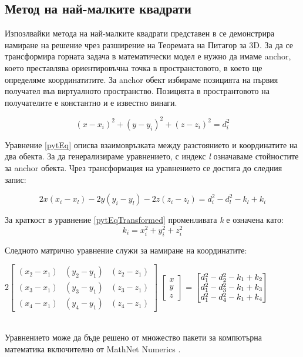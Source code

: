 \subsection{Метод на най-малките квадрати} \label{squares_algorithm}

Изпозлвайки метода на най-малките квадрати представен в \cite{leastsq} се демонстрира намиране на решение чрез разширение на Теоремата на Питагор за 3D. За да се трансформира горната задача в математически модел е нужно да имаме anchor\cite{leastsq2}, което преставлява ориентировъчна точка в пространстовото, в което ще определяме координатитите. За anchor обект избираме позицията на първия получател във виртуалното пространство. Позицията в пространтовото на получателите е константно и е известно винаги.


\begin{equation} \label{pytEq}
   (x-x_i)^2 + (y-y_i)^2 + (z-z_i)^2=d_i^2
\end{equation}

Уравнение \ref{pytEq} описва взаимовръзката между разстоянието и координатите на два обекта. За да генерализираме уравнението, с индекс \textit{l} означаваме стойностите за anchor обекта. Чрез трансформация на уравнението се достига до следния запис:

\begin{equation} \label{pytEqTransformed}
  2 x (x_i - x_l) - 2 y (y_i - y_l) - 2  z  (z_i - z_l) = d^2_i - d^2_l - k_l + k_i
\end{equation}

За краткост в уравнение \ref{pytEqTransformed} променливата \textit{k} е означена като: 
\begin{equation} \label{kdesc}
    k_i= x^2_i + y^2_i + z^2_i
\end{equation}

Следното матрично уравнение служи за намиране на координатите:\\

\centerline{
    $
    2 \begin{bmatrix}
        (x_2-x_1) & (y_2 - y_1) & (z_2 - z_1)\\
        (x_3-x_1) & (y_3 - y_1) & (z_3 - z_1)\\
        (x_4-x_1) & (y_4 - y_1) & (z_4 - z_1)
    \end{bmatrix}
    $
    $
    \begin{bmatrix}
        x\\y\\z
    \end{bmatrix}
    $
    =
    $
    \begin{bmatrix}
        d^2_1 - d^2_2 - k_1 + k_2\\
        d^2_1 - d^2_3 - k_1 + k_3\\
        d^2_1 - d^2_4 - k_1 + k_4\\
    \end{bmatrix}\\
    $
}\\

Уравнението може да бъде решено от множество пакети за компютърна математика включително от MathNet Numerics \cite{numerics}.